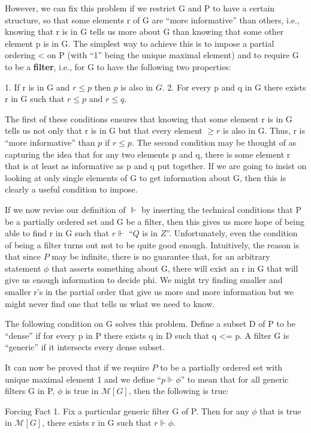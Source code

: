 \documentclass[10pt]{article}
\begin{document}
However, we can fix this problem if we restrict G and P to have a certain structure, so that some elements r of G are ``more informative'' than others, i.e., knowing that r is in G tells us more about G than knowing that some other element p is in G. The simplest way to achieve this is to impose a partial ordering < on P (with ``1'' being the unique maximal element) and to require G to be a \textbf{filter}, i.e., for G to have the following two properties:

1. If r is in G and $r \leq p$ then $p$ is also in $G$.
2. For every p and q in G there exists r in G such that $r \leq p$ and $r \leq q$.

The first of these conditions ensures that knowing that some element r is in G tells us not only that r is in G but that every element $\geq r$ is also in G. Thus, r is ``more informative'' than $p$ if $r \leq p$. The second condition may be thought of as capturing the idea that for any two elements p and q, there is some element r that is at least as informative as p and q put together. If we are going to insist on looking at only single elements of G to get information about G, then this is clearly a useful condition to impose.

If we now revise our definition of $\Vdash$ by inserting the technical conditions that P be a partially ordered set and G be a filter, then this gives us more hope of being able to find r in G such that $r \Vdash$ ``$Q$ is in $Z$''. Unfortunately, even the condition of being a filter turns out not to be quite good enough. Intuitively, the reason is that since $P$ may be infinite, there is no guarantee that, for an arbitrary statement $\phi$ that asserts something about G, there will exist an r in G that will give us enough information to decide phi. We might try finding smaller and smaller r's in the partial order that give us more and more information but we might never find one that tells us what we need to know.

The following condition on G solves this problem. Define a subset D of P to be ``dense'' if for every p in P there exists q in D such that q <= p. A filter G is ``generic'' if it intersects every dense subset.

It can now be proved that if we require $P$ to be a partially ordered set with
unique maximal element 1 and we define ``$p \Vdash \phi$'' to mean that for all
generic filters G in P, $\phi$ is true in $\mathcal{M}[G]$, then the following is true:

Forcing Fact 1. Fix a particular generic filter G of P. Then for any $\phi$
that is true in $\mathcal{M}[G]$, there exists r in G such that $r \Vdash \phi$.
\end{document}
